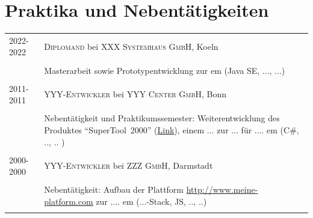 \documentclass[a4paper,10pt]{article}
\begin{document}
\section{Praktika und Nebentätigkeiten}
\begin{tabular}{R{1.5cm}|p{12.0cm}}

 \textsc{2022-2022} &  \textsc{Diplomand} bei \textsc{XXX Systemhaus GmbH}, Koeln\\&\emph{ }\\&\footnotesize{Masterarbeit sowie Prototypentwicklung zur 
  em
 (Java SE, ..., ...)}\\ \\

 \textsc{2011-2011} & \textsc{YYY-Entwickler} bei \textsc{YYY Center GmbH}, Bonn\\&\emph{ }\\&\footnotesize{
 Nebentätigkeit und Praktikumssemester: Weiterentwicklung des Produktes \enquote{\mbox{SuperTool 2000}} (\href{http://www.supertool2000.com}{Link}), einem ... zur ... für ....  
   em
  (C\#, .., .. )
 }\\ \\

 \textsc{2000-2000} & \textsc{YYY-Entwickler} bei \textsc{ZZZ GmbH}, Darmstadt \\&\emph{ }\\&\footnotesize{Nebentätigkeit: Aufbau der Plattform \url{http://www.meine-platform.com} zur ....
  em
 (...-Stack, JS, .., ..)
 }\\ \\

\end{tabular}


\end{document}
